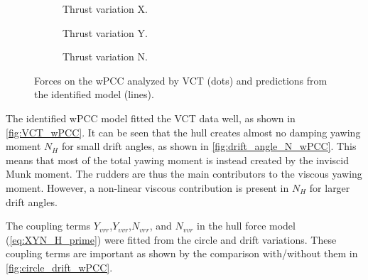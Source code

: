 \begin{figure}[H]
     \vfill
     \begin{subfigure}[b]{0.32\textwidth}
         \centering
         
        \caption{Thrust variation X.}
        \label{fig:Thrust variation_X_wPCC}
     \end{subfigure}
     \hfill
     \begin{subfigure}[b]{0.32\textwidth}
         \centering
         
        \caption{Thrust variation Y.}
        \label{fig:Thrust variation_Y_wPCC}
     \end{subfigure}
     \hfill
     \begin{subfigure}[b]{0.32\textwidth}
         \centering
         
        \caption{Thrust variation N.}
        \label{fig:Thrust variation_N_wPCC}
     \end{subfigure}
     
    \caption{Forces on the wPCC analyzed by VCT (dots) and predictions from the identified model (lines).}
    \label{fig:VCT_wPCC}
\end{figure}

\noindent The identified wPCC model fitted the VCT data well, as shown in \autoref{fig:VCT_wPCC}. 
It can be seen that the hull creates almost no damping yawing moment $N_H$ for small drift angles, as shown in \autoref{fig:drift_angle_N_wPCC}. This means that most of the total yawing moment is instead created by the inviscid Munk moment. The rudders are thus the main contributors to the viscous yawing moment. However, a non-linear viscous contribution is present in $N_H$ for larger drift angles. 

The coupling terms $Y_{vrr}$,$Y_{vvr}$,$N_{vrr}$, and $N_{vvr}$ in the hull force model (\autoref{eq:XYN_H_prime}) were fitted from the circle and drift variations. These coupling terms are important as shown by the comparison with/without them in \autoref{fig:circle_drift_wPCC}.



